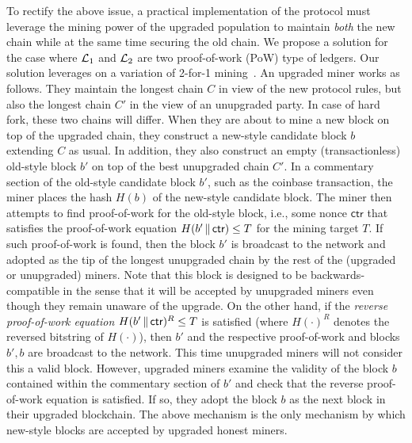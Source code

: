 To rectify the above issue, a practical implementation of the protocol must leverage the mining power of the
upgraded population to maintain \emph{both} the new chain while at the same time securing the old chain. We propose a solution for the case where $\mathcal{L}_1$ and $\mathcal{L}_2$ are two proof-of-work (PoW) type of ledgers.
Our solution leverages on a variation of 2-for-1 mining~\cite{EC:GarKiaLeo15}.
An upgraded miner works as follows. They maintain the longest chain $C$ in view of the new protocol rules, but
also the longest chain $C'$ in the view of an unupgraded party. In case of hard fork, these two chains will
differ. When they are about to mine a new block on top of the upgraded chain,
they construct a new-style candidate block $b$ extending $C$ as usual. In addition, they also construct an empty (transactionless) old-style block $b'$ on top of the best unupgraded chain $C'$. In a commentary section of the old-style candidate block $b'$, such as the coinbase transaction, the miner
places the hash $H(b)$ of the new-style candidate block. The miner then attempts to find proof-of-work for the old-style block,
i.e., some nonce $\textsf{ctr}$ that satisfies the proof-of-work equation $H(b' \,\|\, \textsf{ctr}) \leq T$ for the mining target $T$.
If such proof-of-work is found, then the block $b'$ is broadcast to the network and adopted as the tip of the longest unupgraded chain by
the rest of the (upgraded or unupgraded) miners. Note that this block is designed to be backwards-compatible in the sense that
it will be accepted by unupgraded miners even though they remain unaware of the upgrade. On the other hand, if the \emph{reverse proof-of-work equation} $H(b' \,\|\, \textsf{ctr})^R \leq T$ is satisfied (where $H(\cdot)^R$ denotes the reversed bitstring of $H(\cdot)$), then $b'$ and the respective proof-of-work and blocks $b', b$ are
broadcast to the network. This time unupgraded miners will not consider this a valid block. However,
upgraded miners examine the validity of the block $b$ contained within the commentary section of $b'$ and check that the reverse proof-of-work equation is
satisfied. If so, they adopt the block $b$ as the next block in their upgraded blockchain. The above mechanism is the only mechanism
by which new-style blocks are accepted by upgraded honest miners.

